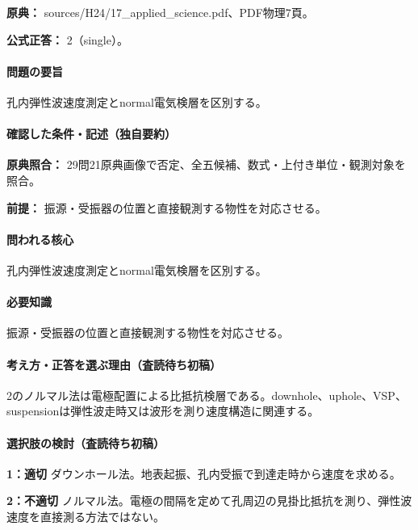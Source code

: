\noindent\textbf{原典：} sources/H24/17\_applied\_science.pdf、PDF物理7頁。

\textbf{公式正答：} 2（single）。

\paragraph{問題の要旨} 孔内弾性波速度測定とnormal電気検層を区別する。

\paragraph{確認した条件・記述（独自要約）}\mbox{}\par

\noindent\textbf{原典照合：} 29問21原典画像で否定、全五候補、数式・上付き単位・観測対象を照合。\par

\noindent\textbf{前提：} 振源・受振器の位置と直接観測する物性を対応させる。\par

\paragraph{問われる核心} 孔内弾性波速度測定とnormal電気検層を区別する。

\paragraph{必要知識} 振源・受振器の位置と直接観測する物性を対応させる。

\paragraph{考え方・正答を選ぶ理由（査読待ち初稿）} 2のノルマル法は電極配置による比抵抗検層である。downhole、uphole、VSP、suspensionは弾性波走時又は波形を測り速度構造に関連する。

\paragraph{選択肢の検討（査読待ち初稿）}\mbox{}\par

\noindent\textbf{1：適切} ダウンホール法。地表起振、孔内受振で到達走時から速度を求める。\par

\noindent\textbf{2：不適切} ノルマル法。電極の間隔を定めて孔周辺の見掛比抵抗を測り、弾性波速度を直接測る方法ではない。\par

